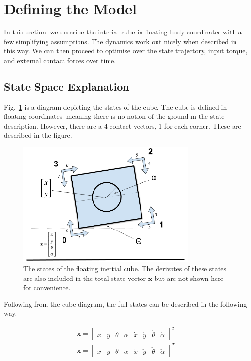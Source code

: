 \documentclass[conference]{IEEEtran}
\begin{document}
\section{Defining the Model}

In this section, we describe the interial cube in floating-body coordinates with a few simplifying assumptions. The dynamics work out nicely when described in this way. We can then proceed to optimize over the state trajectory, input torque, and external contact forces over time.

\subsection{State Space Explanation}

Fig.~\ref{fig:cube} is a diagram depicting the states of the cube. The cube is defined in floating-coordinates, meaning there is no notion of the ground in the state description. However, there are a 4 contact vectors, 1 for each corner. These are described in the figure.

\begin{figure}[htbp]
\centerline{\includegraphics[width=9cm,keepaspectratio]{media/cube_states.png}}
\caption{The states of the floating inertial cube. The derivates of these states are also included in the total state vector $\textbf{x}$ but are not shown here for convenience.}
\label{fig:cube}
\end{figure}

Following from the cube diagram, the full states can be described in the following way.

\begin{align}
  \textbf{x} =
    \begin{bmatrix}
         x &
         y &
         \theta &
         \alpha &
         \dot x &
         \dot y &
         \dot \theta &
         \dot \alpha
    \end{bmatrix}^{T} \\
  \bm{\dot x} =
    \begin{bmatrix}
         \dot x &
         \dot y &
         \dot \theta &
         \dot \alpha &
         \ddot x &
         \ddot y &
         \ddot \theta &
         \ddot \alpha
    \end{bmatrix}^{T}
\end{align}
\end{document}

